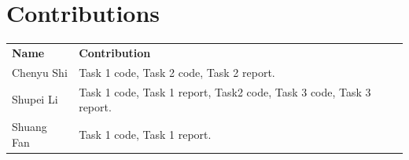 \documentclass{article}
\begin{document}
\section*{Contributions}
\begin{tabular}{ll}
    \textbf{Name} & \textbf{Contribution}\\
    Chenyu Shi & Task 1 code, Task 2 code, Task 2 report.\\
    Shupei Li & Task 1 code, Task 1 report, Task2 code, Task 3 code, Task 3 report.\\
    Shuang Fan & Task 1 code, Task 1 report.\\
\end{tabular}
\end{document}
